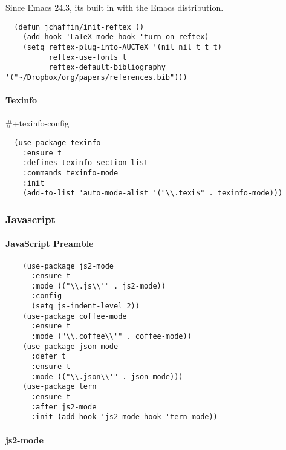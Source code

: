 \documentclass[11pt]{article}
\begin{document}
Since Emacs 24.3, its built in with the Emacs distribution.

\begin{verbatim}
  (defun jchaffin/init-reftex ()
    (add-hook 'LaTeX-mode-hook 'turn-on-reftex)
    (setq reftex-plug-into-AUCTeX '(nil nil t t t)
          reftex-use-fonts t
          reftex-default-bibliography '("~/Dropbox/org/papers/references.bib")))
\end{verbatim}

\paragraph*{Texinfo}
\label{sec:orgd281516}

\#+texinfo-config
\begin{verbatim}
  (use-package texinfo
    :ensure t
    :defines texinfo-section-list
    :commands texinfo-mode
    :init
    (add-to-list 'auto-mode-alist '("\\.texi$" . texinfo-mode)))
\end{verbatim}

\subsubsection*{Javascript}
\label{sec:org556ea14}
\paragraph*{JavaScript Preamble}
\label{sec:orgcfef13f}

\begin{verbatim}
    (use-package js2-mode
      :ensure t
      :mode (("\\.js\\'" . js2-mode))
      :config
      (setq js-indent-level 2))
    (use-package coffee-mode
      :ensure t
      :mode ("\\.coffee\\'" . coffee-mode))
    (use-package json-mode
      :defer t
      :ensure t
      :mode (("\\.json\\'" . json-mode)))
    (use-package tern
      :ensure t
      :after js2-mode
      :init (add-hook 'js2-mode-hook 'tern-mode))
\end{verbatim}

\paragraph*{js2-mode}
\label{sec:orgbe18e11}
\end{document}
